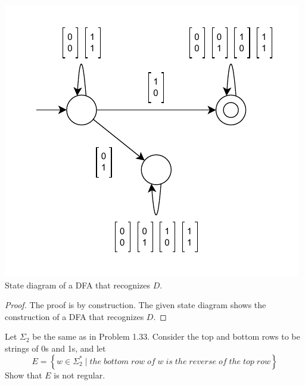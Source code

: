 \documentclass[11pt]{article}
\newenvironment{problem}[2][Problem]{\begin{trivlist}
\item[\hskip \labelsep {\bfseries #1}\hskip \labelsep {\bfseries #2.}]}{\end{trivlist}}
\begin{document}
\begin{center}
\includegraphics[scale=0.9]{Figures/Problem1.34.pdf} \\
State diagram of a DFA that recognizes $D$.
\end{center}

\begin{proof}
The proof is by construction. The given state diagram shows the construction of a DFA that recognizes $D$.
\end{proof}

\begin{problem}{1.35}
Let $\Sigma_{2}$ be the same as in Problem 1.33. Consider the top and bottom rows to be strings of 0s and 1s, and let
\[
E = 
\left\{
w \in \Sigma_{2}^{*} \; | \; the \; bottom \; row \; of \; w \; is \; the \; reverse \; of \; the \; top \; row
\right\}
\]
Show that $E$ is not regular.
\end{problem}
\end{document}
